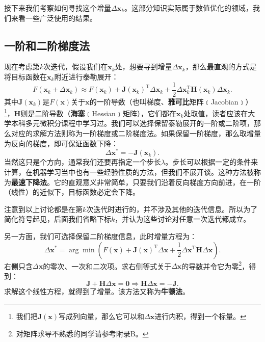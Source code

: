接下来我们考察如何寻找这个增量$\Delta \bm{x}_k$。这部分知识实际属于数值优化的领域，我们来看一些广泛使用的结果。

\subsection{一阶和二阶梯度法}
现在考虑第$k$次迭代，假设我们在$\bm{x}_k$处，想要寻到增量$\Delta \bm{x}_k$，那么最直观的方式是将目标函数在$\bm{x}_k$附近进行泰勒展开：
\begin{equation}
F(\bm{x}_k+\Delta \bm{x}_k) \approx F{\left( \bm{x}_k \right)} + \bm{J} \left( \bm{x}_k \right) ^\mathrm{T} \Delta \bm{x}_k + \frac{1}{2}\Delta {\bm{x}_k^\mathrm{T}}\bm{H}(\bm{x}_k) \Delta \bm{x}_k.
\end{equation}
其中$\bm{J}(\bm{x}_k)$是$F(\bm{x})$关于$\bm{x}$的一阶导数（也叫梯度、\textbf{雅可比}矩阵﹝Jacobian﹞）\footnote{我们把$\bm{J}(\bm{x})$写成列向量，那么它可以和$\Delta \bm{x}$进行内积，得到一个标量。}，$\bm{H}$则是二阶导数（\textbf{海塞}﹝Hessian﹞矩阵），它们都在$\bm{x}_k$处取值，读者应该在大学本科多元微积分课程中学习过。我们可以选择保留泰勒展开的一阶或二阶项，那么对应的求解方法则称为一阶梯度或二阶梯度法。如果保留一阶梯度，那么取增量为反向的梯度，即可保证函数下降：
\begin{equation}
\Delta \bm{x}^* = - \bm{J}(\bm{x}_k).
\end{equation}
当然这只是个方向，通常我们还要再指定一个步长$\lambda$。步长可以根据一定的条件来计算\textsuperscript{\cite{Wolfe1969}}，在机器学习当中也有一些经验性质的方法，但我们不展开谈。这种方法被称为\textbf{最速下降法}。它的直观意义非常简单，只要我们沿着反向梯度方向前进，在一阶（线性）的近似下，目标函数必定会下降。

注意到以上讨论都是在第$k$次迭代时进行的，并不涉及其他的迭代信息。所以为了简化符号起见，后面我们省略下标$k$，并认为这些讨论对任意一次迭代都成立。

另一方面，我们可选择保留二阶梯度信息，此时增量方程为：
\begin{equation}
\Delta \bm{x}^* = \arg \min \left(F\left( \bm{x} \right) + \bm{J} \left( \bm{x} \right)^\mathrm{T} \Delta \bm{x} + \frac{1}{2}\Delta {\bm{x}^\mathrm{T}}\bm{H} \Delta \bm{x} \right).
\end{equation}
右侧只含$\Delta \bm{x}$的零次、一次和二次项。求右侧等式关于$\Delta \bm{x}$的导数并令它为零\footnote{对矩阵求导不熟悉的同学请参考附录B。}，得到：
\begin{equation}
\bm{J} + \bm{H} \Delta \bm{x} = \bm{0} \Rightarrow
\bm{H} \Delta \bm{x} = -\bm{J}.
\end{equation}
求解这个线性方程，就得到了增量。该方法又称为\textbf{牛顿法}。

